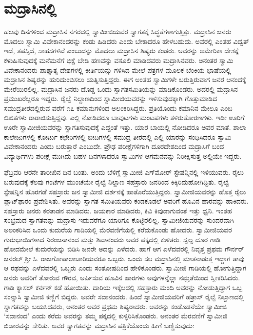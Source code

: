 
\chapter{ಮದ್ರಾಸಿನಲ್ಲಿ }

 ಹಲವು ದಿನಗಳಿಂದ ಮದ್ರಾಸಿನ ನಗರದಲ್ಲಿ ಸ್ವಾಮೀಜಿಯವರ ಸ್ವಾಗತಕ್ಕೆ ಸಿದ್ಧತೆಗಳಾಗುತ್ತಿತ್ತು. ಮದ್ರಾಸಿನ ಜನರು ಮೊದಲು ಸ್ವಾಮಿ ವಿವೇಕಾನಂದರನ್ನು ಕಂಡು ಹಿಡಿದರು ಎಂದು ಬೇಕಾದರೂ ಹೇಳಬಹುದು. ಅವರಲ್ಲಿ ಎಂತಹ ವಿದ್ವತ್ ಇದೆ, ತಪಸ್ಸಿದೆ, ಸಾಹಸಗಳಿವೆ ಎಂಬುದನ್ನು ಮೊದಲು ಮದ್ರಾಸಿನ ಶಿಷ್ಯರು ಕಂಡರು. ಅವರನ್ನು ಅಮೇರಿಕಾ ದೇಶಕ್ಕೆ ಕಳುಹಿಸುವುದಕ್ಕೆ ಮನೆಮನೆಗೆ ಭಿಕ್ಷೆ ಬೇಡಿ ಹಣವನ್ನು ವಸೂಲಿ ಮಾಡಿದವರು ಮದ್ರಾಸಿನವರು. ಅನಂತರ ಸ್ವಾಮಿ ವಿವೇಕಾನಂದರು ಪಾಶ್ಚಾತ್ಯ ದೇಶಗಳಲ್ಲಿ ಕೀರ್ತಿಯನ್ನು ಗಳಿಸಿದ ಮೇಲೆ ಪತ್ರಗಳ ಮೂಲಕ ಬೆಂಕಿಯ ಭಾಷೆಯಲ್ಲಿ ಮದ್ರಾಸಿನ ಶಿಷ್ಯರನ್ನು ಹುರಿದುಂಬಿಸಲು ಯತ್ನಿಸುತ್ತಿದ್ದರು. ಈಗ ಅಂತಹ ಸ್ವಾಮಿಗಳೇ ಬರುತ್ತಿರುವಾಗ ಜನರ ಆನಂದಕ್ಕೆ ಮೇರೆಯಿರಲಿಲ್ಲ. ಮದ್ರಾಸಿನ ಜನರು ದೊಡ್ಡ ಒಂದು ಸ್ವಾಗತಸಮಿತಿಯನ್ನು ಮಾಡಿಕೊಂಡರು. ಅದರಲ್ಲಿ ಮದ್ರಾಸಿನ ಪ್ರಮುಖರೆಲ್ಲರೂ ಇದ್ದರು. ರೈಲ್ವೆ ನಿಲ್ದಾಣದಿಂದ ಸ್ವಾಮೀಜಿಯವರನ್ನು ಇಳಿಸುವುದಕ್ಕಾಗಿ ಗೊತ್ತುಮಾಡಿದ ಸಮುದ್ರತೀರದಲ್ಲಿರುವ  ವರೆಗೆ ೧೭ ಕಮಾನುಗಳಿಂದ ಅಲಂಕರಿಸಿದ್ದರು. ಪ್ರತಿಯೊಂದು ಕಮಾನಿನ ಮೇಲೂ  ಎಂಬ ಲಿಖಿತಗಳು ರಾರಾಜಿಸುತ್ತಿದ್ದವು. ಎಲ್ಲಿ ನೋಡಿದರೂ ಬಾವುಟಗಳು ಮಂಟಪಗಳು ತಳಿರುತೋರಣಗಳು. ಇಡೀ ಊರಿಗೆ ಊರೇ ಸ್ವಾಮೀಜಿಯವರನ್ನು ಸ್ವಾಗತಿಸುವುದಕ್ಕೆ ಎದ್ದಂತೆ ಇತ್ತು. ಯಾರ ಬಾಯಲ್ಲಿ ನೋಡಿದರೂ ಅವರ ಮಾತೆ. ಶಾಲಾ ಕಾಲೇಜುಗಳಲ್ಲಿ ಕೋರ್ಟು ಕಛೇರಿಗಳಲ್ಲಿ ಬೀದಿಗಳಲ್ಲಿ ಸಮುದ್ರ ತೀರದಲ್ಲಿ ಎಲ್ಲಿ ಯಾರನ್ನು ಸಂಧಿಸಿದರೂ ಸ್ವಾಮಿ ವಿವೇಕಾನಂದರು ಎಂದು ಬರುತ್ತಾರೆ ಎಂಬುದೇ. ಪ್ರೌಢ ಪರೀಕ್ಷೆಗಳಿಗಾಗಿ ದೂರದೇಶದಿಂದ ಮದ್ರಾಸಿಗೆ ಬಂದ ವಿದ್ಯಾರ್ಥಿಗಳು ಪರೀಕ್ಷೆ ಮುಗಿದು ಬಹಳ ದಿನಗಳಾದರೂ ಸ್ವಾಮಿಗಳ ಆಗಮನವನ್ನು ನಿರೀಕ್ಷಿಸುತ್ತ ಅಲ್ಲಿಯೇ ಇದ್ದರು. 

 ಫೆಬ್ರವರಿ ಆರನೇ ತಾರೀಖಿನ ದಿನ ಬಂತು. ಅಂದು ಬೆಳಿಗ್ಗೆ ಸ್ವಾಮೀಜಿ ಎಗ್‍ಮೋರ್ ಸ್ಟೇಷನ್ನಿನಲ್ಲಿ ಇಳಿಯುವರು. ರೈಲು ಬರುವುದಕ್ಕೆ ಕೆಲವು ಗಂಟೆಗಳ ಮುಂಚೆಯೇ ರೈಲ್ವೆ ನಿಲ್ದಾಣ ಸಹಸ್ರಾರು ಜನರಿಂದ ಕಿಕ್ಕಿರಿದುಹೋಗಿದ್ದಿತು. ರೈಲ್ವೆ ಸ್ಟೇಷನ್ನಿನ ಹೊರಗಡೆ ಸಹಸ್ರಾರು ಜನ ಸ್ವಾಮೀಜಿ ದರ್ಶನಕ್ಕೆ ಹಾತೊರೆಯುತ್ತಿದ್ದರು. ಸ್ವಾಮೀಜಿಯವರನ್ನು ಹೊತ್ತ ರೈಲು ಪ್ಲಾಟ್‍ಫಾರಂ ಪ್ರವೇಶಿಸಿತು. ಅವರನ್ನು ಸ್ವಾಗತ ಸಮಿತಿಯವರು ಕಂಡಕೂಡಲೆ ಅವರಿಗೆ ಹೂವಿನ ಹಾರವನ್ನು ಹಾಕಿದರು. ಸಹಸ್ರಾರು ಜನರು ಕರತಾಡನ ಮಾಡಿದರು. ಜಯಕಾರ ಮಾಡಿದರು, ಕಿವಿ ಕಿವುಡಾಗುವಂತೆ ಇತ್ತು ಧ್ವನಿ. ಇಂತಹ ಸಂಭ್ರಮದ ಸ್ವಾಗತವನ್ನು ಮದ್ರಾಸು ಇದುವರೆಗೂ ಯಾರಿಗೂ ಕೊಟ್ಟಿರಲಿಲ್ಲ. ಸ್ವಾಮೀಜಿಯವರನ್ನು ಸುಂದರವಾಗಿ ಅಲಂಕರಿಸಿದ ಒಂದು ಕುದುರೆಯ ಗಾಡಿಯಲ್ಲಿ ಮೆರವಣಿಗೆಯಲ್ಲಿ ಕರೆದುಕೊಂಡು ಹೋದರು. ಸ್ವಾಮೀಜಿಯವರ ಗುರುಭಾಯಿಗಳಾದ ನಿರಂಜನಾನಂದ ಮತ್ತು ಶಿವಾನಂದರು ಅವರ ಪಕ್ಕದಲ್ಲಿ ಕುಳಿತರು. ಸ್ವಲ್ಪ ದೂರ ಗಾಡಿ ಹೋದಮೇಲೆ ಕುದುರೆಯನ್ನು ಬಿಡಿಸಿ ಜನರೇ ಅದನ್ನು ಎಳೆದರು. ಹಾಗೆ ಆಗ ಎಳೆದವರಲ್ಲಿ ನಿವೃತ್ತ ಪ್ರಥಮ ಗೌರ್ನರ್ ಜನರಲ್ ಶ‍್ರೀ ಸಿ. ರಾಜಗೋಪಾಲಾಚಾರಿಯವರೂ ಒಬ್ಬರು. ಒಂದು ಸಲ ಮದ್ರಾಸಿನಲ್ಲಿ ಮಾತನಾಡುತ್ತ ಇದ್ದಾಗ ತಾವು ಆ ರಥವನ್ನು ಎಳೆದವರಲ್ಲಿ ಒಬ್ಬರು ಎಂದು ಸಂತೋಷದಿಂದ ಹೇಳಿಕೊಂಡರು. ಸ್ವಾಮೀಜಿ ಗಾಡಿಯಲ್ಲಿ ಹೋಗುತ್ತಿದ್ದಾಗ ಜನರು ಅವರಿಗೆ ತೋರುವ ಗೌರವ, ಅರ್ಪಿಸುವ ಹೂವಿನ ಹಾರಗಳು ಅವುಗಳನ್ನೆಲ್ಲಾ ನಮ್ರತೆಯಿಂದ ಸ್ವೀಕರಿಸಿದರು. ಗಾಡಿ ಕ್ಯಾಸಲ್ ಕರ್ನನ್ ಕಡೆ ಹೋಯಿತು. ದಾರಿಯ ಇಕ್ಕೆಲದಲ್ಲಿ ಸಹಸ್ರಾರು ಮಂದಿ ಅವರನ್ನು ನೋಡುತ್ತಿದ್ದಾಗ ಒಬ್ಬ ಸಂನ್ಯಾಸಿ ಸ್ವಾಮೀಜಿ ಕಣ್ಣಿಗೆ ಬಿದ್ದರು. ಅವರೇ ಸದಾನಂದರು. ಹಿಂದೆ ಸ್ವಾಮೀಜಿಯವರಿಗೆ ಹತ್ರಾಸ್ ರೈಲ್ವೆ ನಿಲ್ದಾಣದಲ್ಲಿ ಸ್ವಾಗತವನ್ನು ಬಯಸಿದವರು, ಅನಂತರ ಅವರ ಪ್ರಥಮ ಶಿಷ್ಯರಾದರು. ಅವರನ್ನು ಕಂಡೊಡನೆಯೇ ಸ್ವಾಮೀಜಿ ‘ಸದಾನಂದ’ ಎಂದು ಕರೆದು ಅವರನ್ನು ತಮ್ಮ ಪಕ್ಕದಲ್ಲಿ ಕುಳ್ಳಿರಿಸಿಕೊಂಡರು. ಅನಂತರ ಮೆರವಣಿಗೆ ಸ್ವಾಮೀಜಿ ಬಿಡಾರವನ್ನು ಸೇರಿತು. ಅವರ ಸ್ವಾಗತವನ್ನು ಮದ್ರಾಸಿನ ಪತ್ರಿಕೆಯೊಂದು ಹೀಗೆ ಬಣ್ಣಿಸುವುದು: 

